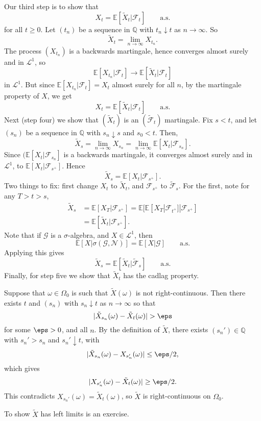 \documentclass[12pt]{article}
\begin{document}
\begin{proofbox}
	Our third step is to show that
	\[
		X_t = \mathbb{E}[\tilde X_t | \mathcal{F}_t] \qquad\text{a.s.}
	\]
	for all $t \geq 0$. Let $(t_n)$ be a sequence in $\mathbb{Q}$ with $t_n \downarrow t$ as $n \to \infty$. So
	\[
	\tilde X_t = \lim_{n \to \infty} X_{t_n}.
	\]
	The process $(X_{t_n})$ is a backwards martingale, hence converges almost surely and in $\mathcal{L}^1$, so
	\[
	\mathbb{E}[X_{t_n} | \mathcal{F}_t] \to \mathbb{E}[\tilde X_t | \mathcal{F}_t]
	\]
	in $\mathcal{L}^1$. But since $\mathbb{E}[X_{t_n} | \mathcal{F}_t] = X_t$ almost surely for all $n$, by the martingale property of $X$, we get
	\[
		X_t = \mathbb{E}[\tilde X_t | \mathcal{F}_t] \qquad \text{a.s.}
	\]
	Next (step four) we show that $(\tilde X_t)$ is an $(\tilde{\mathcal{F}}_t)$ martingale. Fix $s < t$, and let $(s_n)$ be a sequence in $\mathbb{Q}$ with $s_n \downarrow s$ and $s_0 < t$. Then,
	\[
	\tilde X_s = \lim_{n \to \infty} X_{s_n} = \lim_{n \to \infty} \mathbb{E}[X_t | \mathcal{F}_{s_n}].
	\]
	Since $(\mathbb{E}[X_t | \mathcal{F}_{s_n}]$ is a backwards martingale, it converges almost surely and in $\mathcal{L}^1$, to $\mathbb{E}[X_t | \mathcal{F}_{s^+}]$. Hence
	\[
	\tilde X_s = \mathbb{E}[X_t | \mathcal{F}_{s^+}].
	\]
	Two things to fix: first change $X_t$ to $\tilde X_t$, and $\mathcal{F}_{s^+}$ to $\tilde{\mathcal{F}}_s$. For the first, note for any $T > t > s$,
	\begin{align*}
		\tilde X_s &= \mathbb{E}[X_T | \mathcal{F}_{s^{+}}] = \mathbb{E}[\mathbb{E}[X_T | \mathcal{F}_{t^+}] | \mathcal{F}_{s^+}] \\
			   &= \mathbb{E}[\tilde X_t | \mathcal{F}_{s^+}].
	\end{align*}
	Note that if $\mathcal{G}$ is a $\sigma$-algebra, and $X \in \mathcal{L}^1$, then
	\[
		\mathbb{E}[X |\sigma(\mathcal{G}, \mathcal{N})] = \mathbb{E}[X | \mathcal{G}]\qquad \text{a.s.}
	\]
	Applying this gives
	\[
		\tilde X_s = \mathbb{E}[\tilde X_t | \tilde{\mathcal{F}}_s]\qquad \text{a.s.}
	\]
	Finally, for step five we show that $\tilde X_t$ has the cadlag property.

	Suppose that $\omega \in \Omega_0$ is such that $\tilde X(\omega)$ is not right-continuous. Then there exists $t$ and $(s_n)$ with $s_n \downarrow t$ as $n \to \infty$ so that
	\[
	|\tilde X_{s_n}(\omega) - \tilde X_t(\omega)| > \eps
	\]
	for some $\eps > 0$, and all $n$. By the definition of $\tilde X$, there exists $(s_n') \in \mathbb{Q}$ with $s_n' > s_n$ and $s_n' \downarrow t$, with
	\[
	|\tilde X_{s_n}(\omega) - X_{s_n'}(\omega)| \leq \eps/2,
	\]
	which gives
	\[
	|X_{s_n'}(\omega) - \tilde X_t(\omega)| \geq \eps/2.
	\]
	This contradicts $X_{s_n'}(\omega) = \tilde X_t(\omega)$, so $\tilde X$ is right-continuous on $\Omega_0$.

	To show $\tilde X$ has left limits is an exercise.
\end{proofbox}
\end{document}
